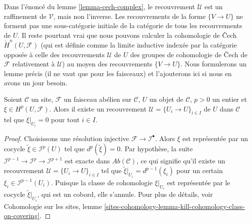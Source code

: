 \begin{remark}
\label{remark-refinement}
Dans l'\'enonc\'e du lemme \ref{lemma-cech-complex}, le recouvrement $\mathcal{U}$
est un raffinement de $\mathcal{V}$, mais non l'inverse. Les recouvrements
de la forme $\{V \to U\}$ ne forment pas une sous-cat\'egorie initiale de la
cat\'egorie de tous les recouvrements de $U$. Il reste pourtant vrai que
nous pouvons calculer la cohomologie de {\v C}ech $\check H^n(U, \mathcal{F})$ (qui
est d\'efinie comme la limite inductive index\'ee par la cat\'egorie oppos\'ee \`a celle des
recouvrements $\mathcal{U}$ de $U$ des groupes de cohomologie de {\v C}ech de
$\mathcal{F}$ relativement \`a $\mathcal{U}$) au moyen des recouvrements
$\{V \to U\}$. Nous formulerons un lemme pr\'ecis (il ne vaut que pour les faisceaux)
et l'ajouterons ici si nous en avons un jour besoin.
\end{remark}

\begin{lemma}
\label{lemma-locality-cohomology}
Soient $\mathcal{C}$ un site, $\mathcal{F}$ un faisceau ab\'elien sur $\mathcal{C}$,
$U$ un objet de $\mathcal{C}$, $p > 0$ un entier et $\xi \in
H^p(U, \mathcal{F})$. Alors il existe un recouvrement
$\mathcal{U} = \{U_i \to U\}_{i \in I}$ de $U$ dans $\mathcal{C}$
tel que $\xi |_{U_i} = 0$ pour tout $i \in I$.
\end{lemma}

\begin{proof}
Choisissons une r\'esolution injective $\mathcal{F} \to \mathcal{I}^\bullet$. Alors
$\xi$ est repr\'esent\'ee par un cocycle $\tilde{\xi} \in \mathcal{I}^p(U)$
tel que $d^p(\tilde{\xi}) = 0$. Par hypoth\`ese, la suite
$\mathcal{I}^{p - 1} \to \mathcal{I}^p \to \mathcal{I}^{p + 1}$ est exacte dans
$\textit{Ab}(\mathcal{C})$, ce qui signifie qu'il existe un recouvrement
$\mathcal{U} = \{U_i \to U\}_{i \in I}$ tel que
$\tilde{\xi}|_{U_i} = d^{p - 1}(\xi_i)$ pour un certain
$\xi_i \in \mathcal{I}^{p-1}(U_i)$. Puisque
la classe de cohomologie $\xi|_{U_i}$ est repr\'esent\'ee par le cocycle
$\tilde{\xi}|_{U_i}$, qui est un cobord, elle s'annule.
Pour plus de d\'etails, voir
Cohomologie sur les sites,
lemme \ref{sites-cohomology-lemma-kill-cohomology-class-on-covering}.
\end{proof}

